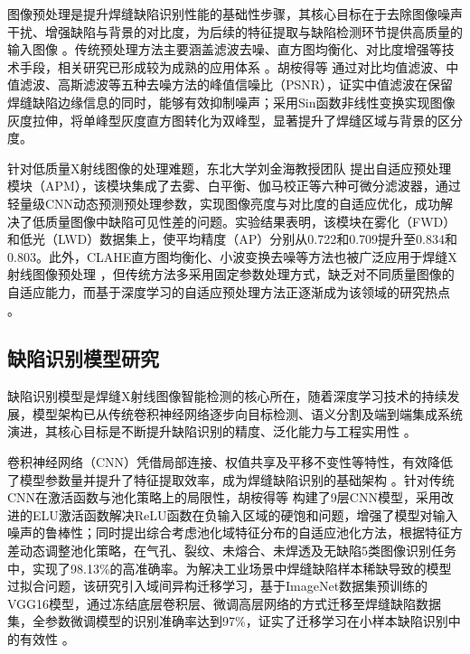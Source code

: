 \documentclass{cjlu_literature_review}
\begin{document}
	图像预处理是提升焊缝缺陷识别性能的基础性步骤，其核心目标在于去除图像噪声干扰、增强缺陷与背景的对比度，为后续的特征提取与缺陷检测环节提供高质量的输入图像 \cite{Hu2020_DeepLearningWeldDefect, Valavanis2010_MulticlassDefectDetection}。传统预处理方法主要涵盖滤波去噪、直方图均衡化、对比度增强等技术手段，相关研究已形成较为成熟的应用体系 \cite{Valavanis2010_MulticlassDefectDetection, Kumar2014_TextureFeatureWeldFlaws}。胡桉得等 \cite{Hu2020_DeepLearningWeldDefect} 通过对比均值滤波、中值滤波、高斯滤波等五种去噪方法的峰值信噪比（PSNR），证实中值滤波在保留焊缝缺陷边缘信息的同时，能够有效抑制噪声；采用Sin函数非线性变换实现图像灰度拉伸，将单峰型灰度直方图转化为双峰型，显著提升了焊缝区域与背景的区分度。
	
	针对低质量X射线图像的处理难题，东北大学刘金海教授团队 \cite{Zuo2025_EndToEndWeldingDefect, Yu2025_IndustrialDefectRecognition} 提出自适应预处理模块（APM），该模块集成了去雾、白平衡、伽马校正等六种可微分滤波器，通过轻量级CNN动态预测预处理参数，实现图像亮度与对比度的自适应优化，成功解决了低质量图像中缺陷可见性差的问题。实验结果表明，该模块在雾化（FWD）和低光（LWD）数据集上，使平均精度（AP）分别从0.722和0.709提升至0.834和0.803。此外，CLAHE直方图均衡化、小波变换去噪等方法也被广泛应用于焊缝X射线图像预处理 \cite{Wei2020_MultiTargetDefectYOLOv3, Cheng2022_YOLOv5Lightweight}，但传统方法多采用固定参数处理方式，缺乏对不同质量图像的自适应能力，而基于深度学习的自适应预处理方法正逐渐成为该领域的研究热点 \cite{Guo2021_ContrastEnhancementGAN, Chen2022_ImprovedCrossEntropyLoss}。
	
	\subsection{缺陷识别模型研究}
	
	缺陷识别模型是焊缝X射线图像智能检测的核心所在，随着深度学习技术的持续发展，模型架构已从传统卷积神经网络逐步向目标检测、语义分割及端到端集成系统演进，其核心目标是不断提升缺陷识别的精度、泛化能力与工程实用性 \cite{He2015_DeepResidualLearning}。
	
	卷积神经网络（CNN）凭借局部连接、权值共享及平移不变性等特性，有效降低了模型参数量并提升了特征提取效率，成为焊缝缺陷识别的基础架构 \cite{Simonyan2014_VeryDeepCNN, Hu2020_DeepLearningWeldDefect}。针对传统CNN在激活函数与池化策略上的局限性，胡桉得等 \cite{Hu2020_DeepLearningWeldDefect, Guo2021_ContrastEnhancementGAN} 构建了9层CNN模型，采用改进的ELU激活函数解决ReLU函数在负输入区域的硬饱和问题，增强了模型对输入噪声的鲁棒性；同时提出综合考虑池化域特征分布的自适应池化方法，根据特征方差动态调整池化策略，在气孔、裂纹、未熔合、未焊透及无缺陷5类图像识别任务中，实现了98.13\%的高准确率。为解决工业场景中焊缝缺陷样本稀缺导致的模型过拟合问题，该研究引入域间异构迁移学习，基于ImageNet数据集预训练的VGG16模型，通过冻结底层卷积层、微调高层网络的方式迁移至焊缝缺陷数据集，全参数微调模型的识别准确率达到97\%，证实了迁移学习在小样本缺陷识别中的有效性 \cite{Guo2021_ContrastEnhancementGAN, Irvin2019_CheXpertDataset, Li2010_ImageNet}。
	
\end{document}
